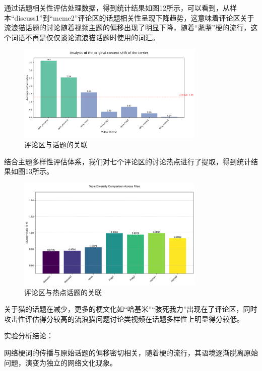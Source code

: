\documentclass[12pt,a4paper]{ctexart}
\begin{document}
通过话题相关性评估处理数据，得到统计结果如图12所示，可以看到，从样本“discuss1”到“meme2”评论区的话题相关性呈现下降趋势，这意味着评论区关于流浪猫话题的讨论随着视频主题的偏移出现了明显下降，随着“耄耋”梗的流行，这个词语不再是仅仅谈论流浪猫话题时使用的词汇。

\begin{figure}[htbp]
    \centering
    \includegraphics[width=0.8\textwidth]{img/comment_area_vs_topic.png}
    \caption{评论区与话题的关联}
    \label{fig:comment_area_vs_topic}
\end{figure}

结合主题多样性评估体系，我们对七个评论区的讨论热点进行了提取，得到统计结果如图13所示。

\begin{figure}[htbp]
    \centering
    \includegraphics[width=0.8\textwidth]{img/comment_area_vs_hot_topic.png}
    \caption{评论区与热点话题的关联}
    \label{fig:comment_area_vs_hot_topic}
\end{figure}

关于猫的话题在减少，更多的梗文化如“哈基米”“骇死我力”出现在了评论区，同时攻击性评估得分较高的流浪猫问题讨论类视频在话题多样性上明显得分较低。

实验分析结论：

网络梗词的传播与原始话题的偏移密切相关，随着梗的流行，其语境逐渐脱离原始问题，演变为独立的网络文化现象。
\end{document}
